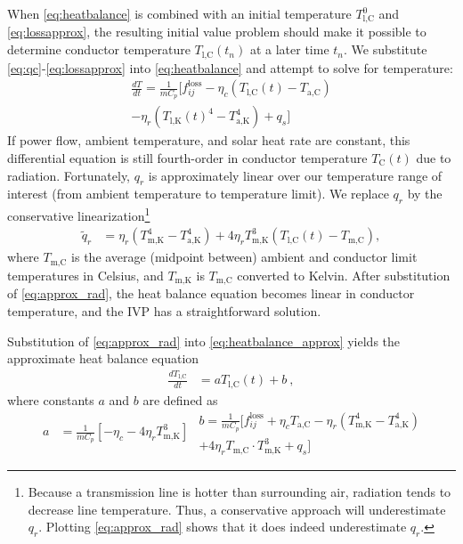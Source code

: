 \documentclass[journal,twoside]{IEEEtran}
\begin{document}
When \eqref{eq:heatbalance} is combined with an initial temperature $T_\text{l,C}^0$ and \eqref{eq:lossapprox}, the resulting initial value problem should make it possible to determine conductor temperature $T_\text{l,C}(t_n)$ at a later time $t_n$. We substitute \eqref{eq:qc}-\eqref{eq:lossapprox} into \eqref{eq:heatbalance} and attempt to solve for temperature:
\begin{multline}\label{eq:heatbalance_approx}
\frac{dT}{dt} = \frac{1}{mC_p}\big[ f_{ij}^\text{loss} - \eta_c\left( T_\text{l,C}(t) - T_\text{a,C}\right) \\ - \eta_r\left(T_\text{l,K}(t)^4 - T_\text{a,K}^4\right) + q_s \big]
\end{multline}
If power flow, ambient temperature, and solar heat rate are constant, this differential equation is still fourth-order in conductor temperature $T_\text{C}(t)$ due to radiation. Fortunately, $q_r$ is approximately linear over our temperature range of interest (from ambient temperature to temperature limit). We replace $q_r$ by the conservative linearization\footnote{Because a transmission line is hotter than surrounding air, radiation tends to decrease line temperature. Thus, a conservative approach will underestimate $q_r$. Plotting \eqref{eq:approx_rad} shows that it does indeed underestimate $q_r$.}
\begin{align}\label{eq:approx_rad}
\tilde{q}_r &= \eta_r  \left( T_\text{m,K}^4 - T_\text{a,K}^4\right) +  4\eta_rT_\text{m,K}^3(T_\text{l,C}(t) - T_\text{m,C}),
\end{align}
where $T_\text{m,C}$ is the average (midpoint between) ambient and conductor limit temperatures in Celsius, and $T_\text{m,K}$ is $T_\text{m,C}$ converted to Kelvin. After substitution of \eqref{eq:approx_rad}, the heat balance equation becomes linear in conductor temperature, and the IVP has a straightforward solution.

Substitution of \eqref{eq:approx_rad} into \eqref{eq:heatbalance_approx} yields the approximate heat balance equation
\begin{align}\label{eq:diffeq}
\frac{dT_\text{l,C}}{dt} &= aT_\text{l,C}(t) + b~,
\end{align}
where constants $a$ and $b$ are defined as
\begin{subequations}
\begin{align}
a &= \frac{1}{mC_p} \left[ -\eta_c - 4\eta_rT_\text{m,K}^3 \right]
\end{align}
\begin{multline}
b = \frac{1}{mC_p} \big[ f_{ij}^\text{loss} + \eta_cT_\text{a,C} - \eta_r \left( T_\text{m,K}^4 - T_\text{a,K}^4 \right) \\ + 4\eta_rT_\text{m,C}\cdot T_\text{m,K}^3 + q_s \big]
\end{multline}
\end{subequations}
\end{document}
